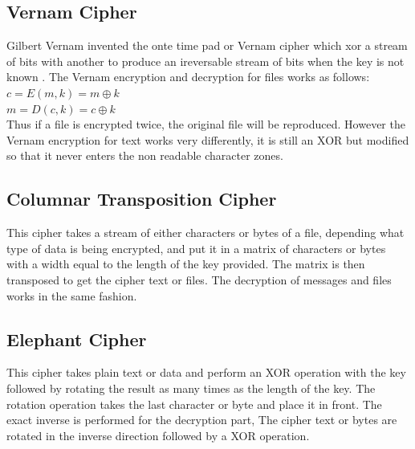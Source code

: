 \documentclass[11pt]{article}
\begin{document}
\subsection{Vernam Cipher}
Gilbert Vernam invented the onte time pad or Vernam cipher which xor a stream of bits with another to produce an ireversable stream of bits when the key is not known \cite{bellovin2011frank}.
The Vernam encryption and decryption for files works as follows\cite{vernam1919secret}:\\
$c = E(m, k) = m \oplus k$\\
$m = D(c, k) = c \oplus k$\\
Thus if a file is encrypted twice, the original file will be reproduced. However the Vernam encryption for text works very differently, it is still an XOR but modified so that it never enters the non readable character zones.

\subsection{Columnar Transposition Cipher}
This cipher takes a stream of either characters or bytes of a file, depending what type of data is being encrypted, and put it in a matrix of characters or bytes with a width equal to the length of the key provided. The matrix is then transposed to get the cipher text or files. The decryption of messages and files works in the same fashion\cite{pfleeger2002security}.

\subsection{Elephant Cipher}
This cipher takes plain text or data and perform an XOR operation with the key followed by rotating the result as many times as the length of the key. The rotation operation takes the last character or byte and place it in front. The exact inverse is performed for the decryption part, The cipher text or bytes are rotated in the inverse direction followed by a XOR operation.
\end{document}
